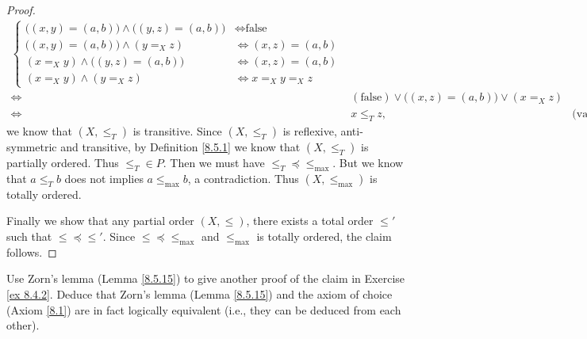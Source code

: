 \begin{proof}
\begin{align*}
\begin{cases}
            \big((x, y) = (a, b)\big) \land \big((y, z) = (a, b)\big) & \iff \text{false}    \\
            \big((x, y) = (a, b)\big) \land (y =_X z)                 & \iff (x, z) = (a, b) \\
            (x =_X y) \land \big((y, z) = (a, b)\big)                 & \iff (x, z) = (a, b) \\
            (x =_X y) \land (y =_X z)                                 & \iff x =_X y =_X z
        \end{cases}                                                             \\
        \iff & (\text{false}) \lor \big((x, z) = (a, b)\big) \lor (x =_X z)                           \\
        \iff & x \leq_T z,                                                  & \text{(vacuously true)}
    \end{align*}
    we know that \((X, \leq_T)\) is transitive.
    Since \((X, \leq_T)\) is reflexive, anti-symmetric and transitive, by Definition \ref{8.5.1} we know that \((X, \leq_T)\) is partially ordered.
    Thus \(\leq_T \in P\).
    Then we must have \(\leq_T \preceq \leq_{\max}\).
    But we know that \(a \leq_T b\) does not implies \(a \leq_{\max} b\), a contradiction.
    Thus \((X, \leq_{\max})\) is totally ordered.

    Finally we show that any partial order \((X, \leq)\), there exists a total order \(\leq'\) such that \(\leq \preceq \leq'\).
    Since \(\leq \preceq \leq_{\max}\) and \(\leq_{\max}\) is totally ordered, the claim follows.
\end{proof}

\begin{exercise}\label{ex 8.5.17}
    Use Zorn's lemma (Lemma \ref{8.5.15}) to give another proof of the claim in Exercise \ref{ex 8.4.2}.
    Deduce that Zorn's lemma (Lemma \ref{8.5.15}) and the axiom of choice (Axiom \ref{8.1}) are in fact logically equivalent
    (i.e., they can be deduced from each other).
\end{exercise}

